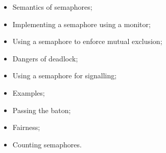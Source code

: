 \documentclass[notes,color]{sepslide0}
\begin{document}











\begin{slide}

\begin{itemize}
\item
Semantics of semaphores;

\item
Implementing a semaphore using a monitor;

\item
Using a semaphore to enforce mutual exclusion;

\item
Dangers of deadlock;

\item
Using a semaphore for signalling;

\item
Examples;

\item
Passing the baton;

\item
Fairness;

\item
Counting semaphores.
\end{itemize}
\end{slide}
\end{document}
